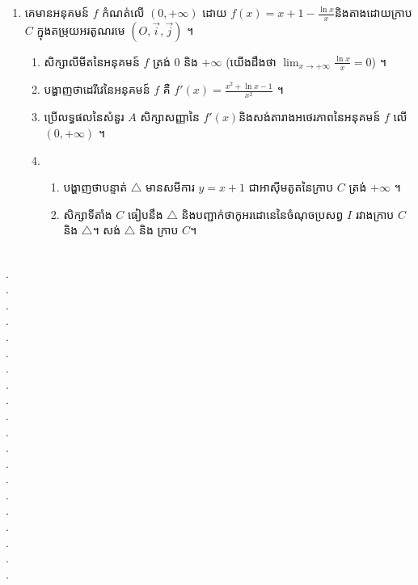 \documentclass{officialexam}
\begin{document}
\begin{enumerate}[I]
\begin{enumerate}[A]
			\item គេមានអនុគមន៍ $f$ កំណត់លើ $\left(0, +\infty\right)$ ដោយ $f(x)=x+1-\frac{\ln x}{x}$​និងតាងដោយក្រាប $C$ ក្នុងតម្រុយអរតូណរមេ $\left(O, \vec{i}, \vec{j}\right)$ ។
			\begin{enumerate}[1]
				\item សិក្សាលីមីតនៃអនុគមន៍ $f$ ត្រង់ $0$ និង $+\infty$ (យើងដឹងថា $\lim_{x\to+\infty}\frac{\ln x}{x}=0$) ។
				\item បង្ហាញថាដេរីវេនៃអនុគមន៍ $f$ គឺ $f'(x)=\frac{x^2+\ln x-1}{x^2}$ ។
				\item ប្រើលទ្ធផលនៃសំនួរ $A$ សិក្សាសញ្ញានៃ $f'(x)$​និងសង់តារាងអថេរភាពនៃអនុគមន៍ $f$ លើ $\left(0, +\infty\right)$ ។
				\item \begin{enumerate}[k]
					\item បង្ហាញថាបន្ទាត់ $\bigtriangleup$ មានសមីការ $y=x+1$ ជាអាស៊ីមតូតនៃក្រាប $C$ ត្រង់ $+\infty$ ។
					\item សិក្សាទីតាំង $C$ ធៀបនឹង $\bigtriangleup$ និងបញ្ជាក់ថាកូអរដោនេនៃចំណុចប្រសព្វ $I$ រវាងក្រាប $C$ និង $\bigtriangleup$។ សង់ $\bigtriangleup$ និង ក្រាប $C$។
				\end{enumerate} 
			\end{enumerate}
		\end{enumerate}
	\end{enumerate}
\\
{\color{white}.}\dotfill\\
{\color{white}.}\dotfill\\
{\color{white}.}\dotfill
\\
{\color{white}.}\dotfill\\
{\color{white}.}\dotfill\\
{\color{white}.}\dotfill
\\
{\color{white}.}\dotfill\\
{\color{white}.}\dotfill\\
{\color{white}.}\dotfill
\\
{\color{white}.}\dotfill\\
{\color{white}.}\dotfill\\
{\color{white}.}\dotfill
\\
{\color{white}.}\dotfill\\
{\color{white}.}\dotfill\\
{\color{white}.}\dotfill
\\
{\color{white}.}\dotfill\\
{\color{white}.}\dotfill\\
{\color{white}.}\dotfill
\\
{\color{white}.}\dotfill\\
{\color{white}.}\dotfill
\newpage
\maketitle
\begin{center}
\end{center}
\end{document}
